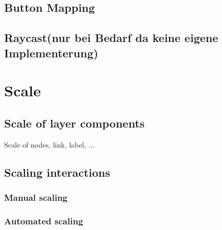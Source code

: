 \subsection{Button Mapping}
\subsection{Raycast(nur bei Bedarf da keine eigene Implementerung)}

\section{Scale}
\subsection{Scale of layer components}
Scale of nodes, link, label, ...
\subsection{Scaling interactions}
\subsubsection{Manual scaling}
\subsubsection{Automated scaling}
